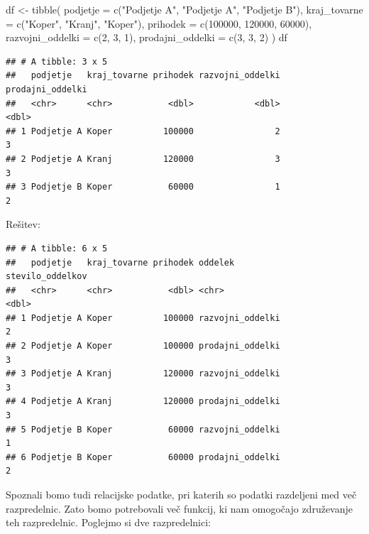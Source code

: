 \documentclass[
]{book}
\newenvironment{Shaded}{\begin{snugshade}}{\end{snugshade}}
\newcommand{\AttributeTok}[1]{\textcolor[rgb]{0.77,0.63,0.00}{#1}}
\newcommand{\DecValTok}[1]{\textcolor[rgb]{0.00,0.00,0.81}{#1}}
\newcommand{\FunctionTok}[1]{\textcolor[rgb]{0.00,0.00,0.00}{#1}}
\newcommand{\NormalTok}[1]{#1}
\newcommand{\OtherTok}[1]{\textcolor[rgb]{0.56,0.35,0.01}{#1}}
\newcommand{\StringTok}[1]{\textcolor[rgb]{0.31,0.60,0.02}{#1}}
\begin{document}
\begin{Shaded}
\begin{Highlighting}[]
\NormalTok{df }\OtherTok{\textless{}{-}} \FunctionTok{tibble}\NormalTok{(}
  \AttributeTok{podjetje =} \FunctionTok{c}\NormalTok{(}\StringTok{"Podjetje A"}\NormalTok{, }\StringTok{"Podjetje A"}\NormalTok{, }\StringTok{"Podjetje B"}\NormalTok{),}
  \AttributeTok{kraj\_tovarne =} \FunctionTok{c}\NormalTok{(}\StringTok{"Koper"}\NormalTok{, }\StringTok{"Kranj"}\NormalTok{, }\StringTok{"Koper"}\NormalTok{),}
  \AttributeTok{prihodek =} \FunctionTok{c}\NormalTok{(}\DecValTok{100000}\NormalTok{, }\DecValTok{120000}\NormalTok{, }\DecValTok{60000}\NormalTok{),}
  \AttributeTok{razvojni\_oddelki =} \FunctionTok{c}\NormalTok{(}\DecValTok{2}\NormalTok{, }\DecValTok{3}\NormalTok{, }\DecValTok{1}\NormalTok{),}
  \AttributeTok{prodajni\_oddelki =} \FunctionTok{c}\NormalTok{(}\DecValTok{3}\NormalTok{, }\DecValTok{3}\NormalTok{, }\DecValTok{2}\NormalTok{)}
\NormalTok{)}
\NormalTok{df}
\end{Highlighting}
\end{Shaded}

\begin{verbatim}
## # A tibble: 3 x 5
##   podjetje   kraj_tovarne prihodek razvojni_oddelki prodajni_oddelki
##   <chr>      <chr>           <dbl>            <dbl>            <dbl>
## 1 Podjetje A Koper          100000                2                3
## 2 Podjetje A Kranj          120000                3                3
## 3 Podjetje B Koper           60000                1                2
\end{verbatim}

Rešitev:

\begin{verbatim}
## # A tibble: 6 x 5
##   podjetje   kraj_tovarne prihodek oddelek          stevilo_oddelkov
##   <chr>      <chr>           <dbl> <chr>                       <dbl>
## 1 Podjetje A Koper          100000 razvojni_oddelki                2
## 2 Podjetje A Koper          100000 prodajni_oddelki                3
## 3 Podjetje A Kranj          120000 razvojni_oddelki                3
## 4 Podjetje A Kranj          120000 prodajni_oddelki                3
## 5 Podjetje B Koper           60000 razvojni_oddelki                1
## 6 Podjetje B Koper           60000 prodajni_oddelki                2
\end{verbatim}

Spoznali bomo tudi relacijske podatke, pri katerih so podatki razdeljeni med več razpredelnic. Zato bomo potrebovali več funkcij, ki nam omogočajo združevanje teh razpredelnic. Poglejmo si dve razpredelnici:
\end{document}
